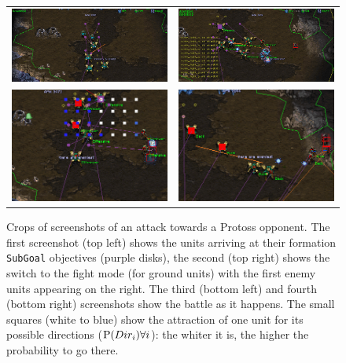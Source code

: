 \begin{figure}[h]
\begin{center}
\begin{tabular}{cc}
\includegraphics[width=0.499\columnwidth]{images/botgame/attack0.png} &
\includegraphics[width=0.499\columnwidth]{images/botgame/attack1.png} \\
\includegraphics[width=0.499\columnwidth]{images/botgame/attack2.png} & 
\includegraphics[width=0.499\columnwidth]{images/botgame/attack3.png}
\end{tabular}
\caption{Crops of screenshots of an attack towards a Protoss opponent. The first screenshot (top left) shows the units arriving at their formation \texttt{SubGoal} objectives (purple disks), the second (top right) shows the switch to the fight mode (for ground units) with the first enemy units appearing on the right. The third (bottom left) and fourth (bottom right) screenshots show the battle as it happens. The small squares (white to blue) show the attraction of one unit for its possible directions ($\mathrm{P}(Dir_i) \forall i$): the whiter it is, the higher the probability to go there.}
\label{fig:bot_attack}
\end{center}
\end{figure}

